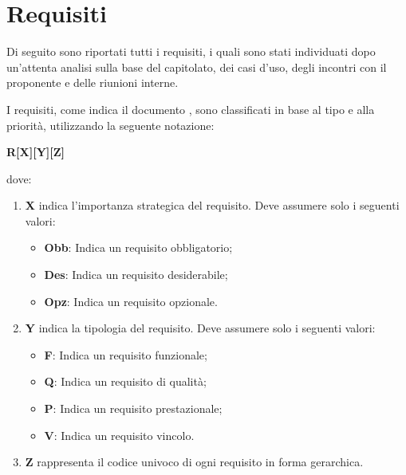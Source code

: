 \documentclass[../AnalisiDeiRequisiti.tex]{subfiles}
\begin{document}
\section{Requisiti}
Di seguito sono riportati tutti i requisiti, i quali sono stati individuati dopo un'attenta analisi sulla base del capitolato, dei casi d’uso, degli incontri con il proponente e delle riunioni interne.

I requisiti, come indica il documento \normediprogettov , sono classificati in base al tipo e alla priorità, utilizzando la seguente notazione:
\begin{center}\textbf{R[X][Y][Z]}\end{center} dove:
\begin{enumerate}
	\item \textbf{X} indica l'importanza strategica del requisito. Deve assumere solo i seguenti valori:
	\begin{itemize}
		\item \textbf{Obb}: Indica un requisito obbligatorio;
		\item \textbf{Des}: Indica un requisito desiderabile;
		\item \textbf{Opz}: Indica un requisito opzionale.
	\end{itemize}
	\item \textbf{Y} indica la tipologia del requisito. Deve assumere solo i seguenti valori:
	\begin{itemize}
		\item \textbf{F}: Indica un requisito funzionale;
		\item \textbf{Q}: Indica un requisito di qualità;
		\item \textbf{P}: Indica un requisito prestazionale;
		\item \textbf{V}: Indica un requisito vincolo.
	\end{itemize}
	\item \textbf{Z} rappresenta il codice univoco di ogni requisito in forma gerarchica.
\end{enumerate}
\end{document}
